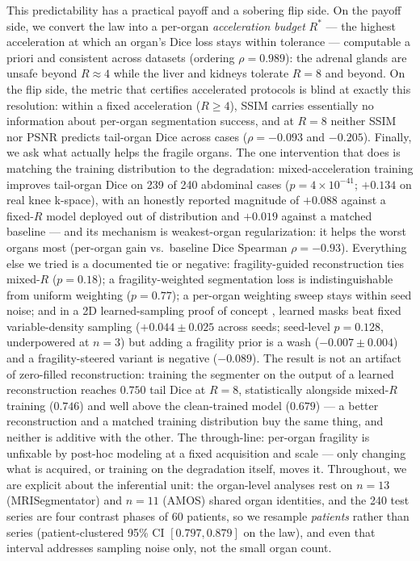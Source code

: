 \documentclass[10pt,twocolumn,letterpaper]{article}
\begin{document}
This predictability has a practical payoff and a sobering flip side. On the payoff side, we convert the law into a per-organ \emph{acceleration budget} $R^{*}$ --- the highest acceleration at which an organ's Dice loss stays within tolerance --- computable a priori and consistent across datasets (ordering $\rho{=}0.989$): the adrenal glands are unsafe beyond $R{\approx}4$ while the liver and kidneys tolerate $R{=}8$ and beyond. On the flip side, the metric that certifies accelerated protocols is blind at exactly this resolution: within a fixed acceleration ($R\geq4$), SSIM carries essentially no information about per-organ segmentation success, and at $R{=}8$ neither SSIM nor PSNR predicts tail-organ Dice across cases ($\rho{=}-0.093$ and $-0.205$). Finally, we ask what actually helps the fragile organs. The one intervention that does is matching the training distribution to the degradation: mixed-acceleration training improves tail-organ Dice on 239 of 240 abdominal cases ($p{=}4\times10^{-41}$; $+0.134$ on real knee k-space), with an honestly reported magnitude of $+0.088$ against a fixed-$R$ model deployed out of distribution and $+0.019$ against a matched baseline --- and its mechanism is weakest-organ regularization: it helps the worst organs most (per-organ gain vs.\ baseline Dice Spearman $\rho{=}-0.93$). Everything else we tried is a documented tie or negative: fragility-guided reconstruction ties mixed-$R$ ($p{=}0.18$); a fragility-weighted segmentation loss is indistinguishable from uniform weighting ($p{=}0.77$); a per-organ weighting sweep stays within seed noise; and in a 2D learned-sampling proof of concept \cite{bahadir2020loupe}, learned masks beat fixed variable-density sampling ($+0.044\pm0.025$ across seeds; seed-level $p{=}0.128$, underpowered at $n{=}3$) but adding a fragility prior is a wash ($-0.007\pm0.004$) and a fragility-steered variant is negative ($-0.089$). The result is not an artifact of zero-filled reconstruction: training the segmenter on the output of a learned reconstruction reaches $0.750$ tail Dice at $R{=}8$, statistically alongside mixed-$R$ training ($0.746$) and well above the clean-trained model ($0.679$) --- a better reconstruction and a matched training distribution buy the same thing, and neither is additive with the other. The through-line: per-organ fragility is unfixable by post-hoc modeling at a fixed acquisition and scale --- only changing what is acquired, or training on the degradation itself, moves it. Throughout, we are explicit about the inferential unit: the organ-level analyses rest on $n{=}13$ (MRISegmentator) and $n{=}11$ (AMOS) shared organ identities, and the 240 test series are four contrast phases of 60 patients, so we resample \emph{patients} rather than series (patient-clustered 95\% CI $[0.797, 0.879]$ on the law), and even that interval addresses sampling noise only, not the small organ count.
\end{document}
